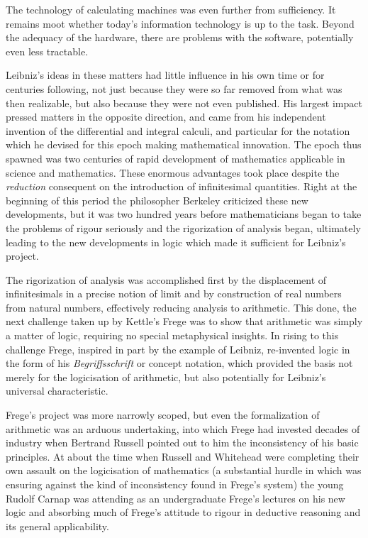 The technology of calculating machines was even further from sufficiency.
It remains moot whether today's information technology is up to the task.
Beyond the adequacy of the hardware, there are problems with the
software, potentially even less tractable. 

Leibniz's ideas in these matters had little influence in his own time
or for centuries following, not just because they were so far removed
from what was then realizable, but also because they were not even
published. 
His largest impact pressed matters in the opposite direction, and came
from his independent invention of the differential and integral
calculi, and particular for the notation which he devised for this
epoch making mathematical innovation. 
The epoch thus spawned was two centuries of rapid development of
mathematics applicable in science and mathematics. 
These enormous advantages took place despite the \emph{reduction}
consequent on the introduction of infinitesimal quantities. 
Right at the beginning of this period the philosopher Berkeley
criticized these new developments, but it was two hundred years before
mathematicians began to take the problems of rigour seriously and the
rigorization of analysis began, ultimately leading to the new
developments in logic which made it sufficient for Leibniz's project. 

The rigorization of analysis was accomplished first by the
displacement of infinitesimals in a precise notion of limit and by
construction of real numbers from natural numbers, effectively
reducing analysis to arithmetic. 
This done, the next challenge taken up by Kettle's Frege was to show
that arithmetic was simply a matter of logic, requiring no special
metaphysical insights. 
In rising to this challenge Frege, inspired in part by the example of
Leibniz, re-invented logic in the form of his \emph{Begriffsschrift}
or concept notation, which provided the basis not merely for the
logicisation of arithmetic, but also potentially for Leibniz's
universal characteristic. 

Frege's project was more narrowly scoped, but even the formalization
of arithmetic was an arduous undertaking, into which Frege had
invested decades of industry when Bertrand Russell pointed out to him
the inconsistency of his basic principles. 
At about the time when Russell and Whitehead were completing their own
assault on the logicisation of mathematics (a substantial hurdle in
which was ensuring against the kind of inconsistency found in Frege's
system) the young Rudolf Carnap was attending as an undergraduate
Frege's lectures on his new logic and absorbing much of Frege's
attitude to rigour in deductive reasoning and its general
applicability. 

